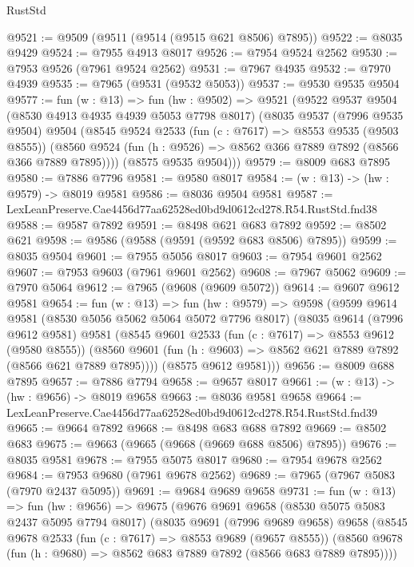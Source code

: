 \begin{lexlean}{RustStd}
\begin{coremodule}
@9521 := @9509 (@9511 (@9514 (@9515 @621 @8506) @7895))
@9522 := @8035 @9429
@9524 := @7955 @4913 @8017
@9526 := @7954 @9524 @2562
@9530 := @7953 @9526 (@7961 @9524 @2562)
@9531 := @7967 @4935
@9532 := @7970 @4939
@9535 := @7965 (@9531 (@9532 @5053))
@9537 := @9530 @9535 @9504
@9577 := fun (w : @13) =>
  fun (hw : @9502) =>
  @9521
    (@9522
      @9537
      @9504
      (@8530 @4913 @4935 @4939 @5053 @7798 @8017)
      (@8035
        @9537
        (@7996 @9535 @9504)
        @9504
        (@8545
          @9524
          @2533
          (fun (c : @7617) => @8553 @9535 (@9503 @8555))
          (@8560 @9524 (fun (h : @9526) => @8562 @366 @7889 @7892 (@8566 @366 @7889 @7895))))
        (@8575 @9535 @9504)))
@9579 := @8009 @683 @7895
@9580 := @7886 @7796
@9581 := @9580 @8017
@9584 := (w : @13) -> (hw : @9579) -> @8019 @9581
@9586 := @8036 @9504 @9581
@9587 := LexLeanPreserve.Cae4456d77aa62528ed0bd9d0612cd278.R54.RustStd.fnd38
@9588 := @9587 @7892
@9591 := @8498 @621 @683 @7892
@9592 := @8502 @621
@9598 := @9586 (@9588 (@9591 (@9592 @683 @8506) @7895))
@9599 := @8035 @9504
@9601 := @7955 @5056 @8017
@9603 := @7954 @9601 @2562
@9607 := @7953 @9603 (@7961 @9601 @2562)
@9608 := @7967 @5062
@9609 := @7970 @5064
@9612 := @7965 (@9608 (@9609 @5072))
@9614 := @9607 @9612 @9581
@9654 := fun (w : @13) =>
  fun (hw : @9579) =>
  @9598
    (@9599
      @9614
      @9581
      (@8530 @5056 @5062 @5064 @5072 @7796 @8017)
      (@8035
        @9614
        (@7996 @9612 @9581)
        @9581
        (@8545
          @9601
          @2533
          (fun (c : @7617) => @8553 @9612 (@9580 @8555))
          (@8560 @9601 (fun (h : @9603) => @8562 @621 @7889 @7892 (@8566 @621 @7889 @7895))))
        (@8575 @9612 @9581)))
@9656 := @8009 @688 @7895
@9657 := @7886 @7794
@9658 := @9657 @8017
@9661 := (w : @13) -> (hw : @9656) -> @8019 @9658
@9663 := @8036 @9581 @9658
@9664 := LexLeanPreserve.Cae4456d77aa62528ed0bd9d0612cd278.R54.RustStd.fnd39
@9665 := @9664 @7892
@9668 := @8498 @683 @688 @7892
@9669 := @8502 @683
@9675 := @9663 (@9665 (@9668 (@9669 @688 @8506) @7895))
@9676 := @8035 @9581
@9678 := @7955 @5075 @8017
@9680 := @7954 @9678 @2562
@9684 := @7953 @9680 (@7961 @9678 @2562)
@9689 := @7965 (@7967 @5083 (@7970 @2437 @5095))
@9691 := @9684 @9689 @9658
@9731 := fun (w : @13) =>
  fun (hw : @9656) =>
  @9675
    (@9676
      @9691
      @9658
      (@8530 @5075 @5083 @2437 @5095 @7794 @8017)
      (@8035
        @9691
        (@7996 @9689 @9658)
        @9658
        (@8545
          @9678
          @2533
          (fun (c : @7617) => @8553 @9689 (@9657 @8555))
          (@8560 @9678 (fun (h : @9680) => @8562 @683 @7889 @7892 (@8566 @683 @7889 @7895))))

\end{coremodule}
\end{lexlean}
